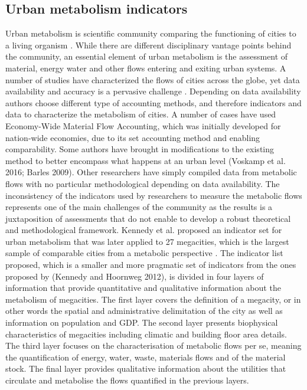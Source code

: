 \documentclass[preprint,12pt]{elsarticle}
\begin{document}
\subsection{Urban metabolism indicators}
Urban metabolism is scientific community comparing the functioning of cities to a living organism \cite{kennedy2015energy}. While there are different disciplinary vantage points behind the community, an essential element of urban metabolism is the assessment of material, energy water and other flows entering and exiting urban systems. A number of studies have characterized the flows of cities across the globe, yet data availability and accuracy is a pervasive challenge \cite{athanassiadis2017towards,barles2009urban,athanassiadis2017exploring,niza2009urban,hoekman2017cape,voskamp2017enhanced}. Depending on data availability authors choose different type of accounting methods, and therefore indicators and data to characterize the metabolism of cities. A number of cases have used Economy-Wide Material Flow Accounting, which was initially developed for nation-wide economies, due to its set accounting method and enabling comparability. Some authors have brought in modifications to the existing method to better encompass what happens at an urban level (Voskamp et al. 2016; Barles 2009). Other researchers have simply compiled data from metabolic flows with no particular methodological depending on data availability. The inconsistency of the indicators used by researchers to measure the metabolic flows represents one of the main challenges of the community as the results is a juxtaposition of assessments that do not enable to develop a robust theoretical and methodological framework. Kennedy et al. \cite{kennedy2014developing} proposed an indicator set for urban metabolism that was later applied to 27 megacities, which is the largest sample of comparable cities from a metabolic perspective \cite{kennedy2015energy}.
The indicator list proposed, which is a smaller and more pragmatic set of indicators from the ones proposed by (Kennedy and Hoornweg 2012), is divided in four layers of information that provide quantitative and qualitative information about the metabolism of megacities. The first layer covers the definition of a megacity, or in other words the spatial and administrative delimitation of the city as well as information on population and GDP. The second layer presents biophysical characteristics of megacities including climatic and building floor area details. The third layer focuses on the characterisation of metabolic flows per se, meaning the quantification of energy, water, waste, materials flows and of the material stock. The final layer provides qualitative information about the utilities that circulate and metabolise the flows quantified in the previous layers.
\end{document}
